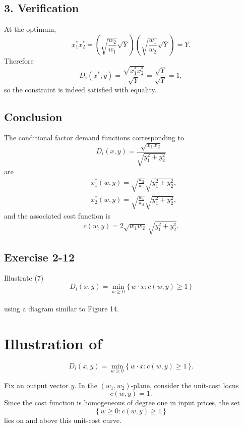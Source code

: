 \subsection*{3. Verification}

At the optimum,
\[
x_1^*x_2^*
=
\left(\sqrt{\frac{w_2}{w_1}}\sqrt{Y}\right)
\left(\sqrt{\frac{w_1}{w_2}}\sqrt{Y}\right)
=
Y.
\]
Therefore
\[
D_i(x^*,y)
=
\frac{\sqrt{x_1^*x_2^*}}{\sqrt{Y}}
=
\frac{\sqrt{Y}}{\sqrt{Y}}
=
1,
\]
so the constraint is indeed satisfied with equality.

\subsection*{Conclusion}

The conditional factor demand functions corresponding to
\[
D_i(x,y)=\frac{\sqrt{x_1x_2}}{\sqrt{y_1^2+y_2^2}}
\]
are
\[
\boxed{
\begin{aligned}
&x_1^*(w,y)=\sqrt{\frac{w_2}{w_1}}\sqrt{y_1^2+y_2^2},\\
&x_2^*(w,y)=\sqrt{\frac{w_1}{w_2}}\sqrt{y_1^2+y_2^2},
\end{aligned}
}
\]
and the associated cost function is
\[
\boxed{
c(w,y)=2\sqrt{w_1w_2}\,\sqrt{y_1^2+y_2^2}.
}
\]




\vspace{30pt}
\begin{tcolorbox}[breakable]

\subsection*{Exercise 2-12}

Illustrate (7) 
\[
D_i(x,y)=\min_{w \ge 0}\{\,w \cdot x : c(w,y)\ge 1\,\}
\]\\
using a diagram similar to Figure 14.

\end{tcolorbox}


\section*{Illustration of}
\[
D_i(x,y)=\min_{w\ge 0}\{\,w\cdot x : c(w,y)\ge 1\,\}.
\]

Fix an output vector \(y\). In the \((w_1,w_2)\)-plane, consider the unit-cost locus
\[
c(w,y)=1.
\]
Since the cost function is homogeneous of degree one in input prices, the set
\[
\{\,w\ge 0 : c(w,y)\ge 1\,\}
\]
lies on and above this unit-cost curve.

